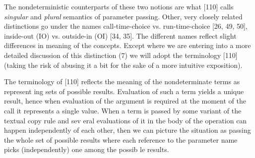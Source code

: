 \documentclass[10pt]{article}
\begin{document}
The nondeterministic 
counterparts of these two notions are what [110] calls {\em singular} 
and {\em plural} semantics of parameter passing. Other, very 
closely related distinctions go under the names call-time-choice vs. 
run-time-choice  [26, 49, 50], inside-out (IO) vs. outside-in (OI) 
[34, 35]. The different names reflect slight differences in meaning 
of the concepts. Except where we are entering into a
 more detailed discussion of this distinction (7) we will adopt the 
terminology [110] (taking the risk of abusing it a bit for the sake 
of a more intuitive exposition). \par 
The terminology of [110] reflects the meaning of the nondeterminate 
terms as represent
ing sets of possible results. Evaluation of such a term yields a 
unique result, hence when evaluation of the argument is required at 
the moment of the call it represents a single value. When a term is 
passed by some variant of the textual copy rule and sev
eral evaluations of it in the body of the operation can happen 
independently of each other, then we can picture the situation as 
passing the whole set of possible results where each reference to the 
parameter name picks (independently) one among the possib
le results.
\end{document}
